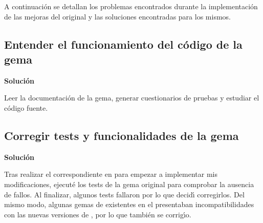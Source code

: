 A continuaci\'on se detallan los problemas encontrados durante la implementaci\'on de las mejoras del  original y las soluciones
encontradas para los mismos.

\subsection{Entender el funcionamiento del c\'odigo de la gema}
\label{subsec:3.1.1}
\bigskip

{\normalsize {\bfseries Soluci\'on}}
\bigskip

Leer la documentaci\'on de la gema, generar cuestionarios de pruebas y estudiar el c\'odigo fuente.

\subsection{Corregir tests y funcionalidades de la gema}
\label{subsec:3.1.2}
\bigskip

{\normalsize {\bfseries Soluci\'on}}
\bigskip

Tras realizar el correspondiente \cei{\ref{apend1:fork}} en  para empezar a implementar mis modificaciones, ejecut\'e los tests de la 
gema original para comprobar la ausencia de fallos. Al finalizar, algunos tests fallaron por lo que decid\'{\i} corregirlos. Del 
mismo modo, algunas gemas de  existentes en el \ceit{\ref{apend1:gemfile}} presentaban incompatibilidades con las nuevas versiones de , por
lo que tambi\'en se corrig\'{\i}o.
\bigskip
